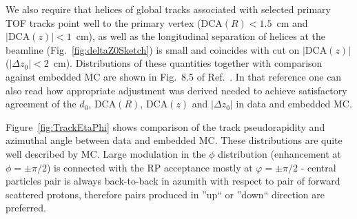 We also require that helices of global tracks associated with selected primary TOF tracks point well to the primary vertex ($\text{DCA}(R)<1.5$~cm and $|\text{DCA}(z)|<1$~cm), as well as the longitudinal separation of helices at the beamline (Fig.~\ref{fig:deltaZ0Sketch}) is small and coincides with cut on $|\text{DCA}(z)|$ ($|\Delta z_{0}|<2$~cm). Distributions of these quantities together with comparison against embedded MC are shown in Fig.~8.5 of Ref.~\cite{supplementaryNote}. In that reference one can also read how appropriate adjustment was derived needed to achieve satisfactory agreement of the $d_{0}$, $\text{DCA}(R)$, $\text{DCA}(z)$ and $|\Delta z_{0}|$ in data and embedded MC.

Figure~\ref{fig:TrackEtaPhi} shows comparison of the track pseudorapidity and azimuthal angle between data and embedded MC. These distributions are quite well described by MC. Large modulation in the $\phi$ distribution (enhancement at $\phi=\pm\pi/2$) is connected with the RP acceptance mostly at $\varphi=\pm\pi/2$ - central particles pair is always back-to-back in azumith with respect to pair of forward scattered protons, therefore pairs produced in ''up`` or ''down`` direction are preferred.

